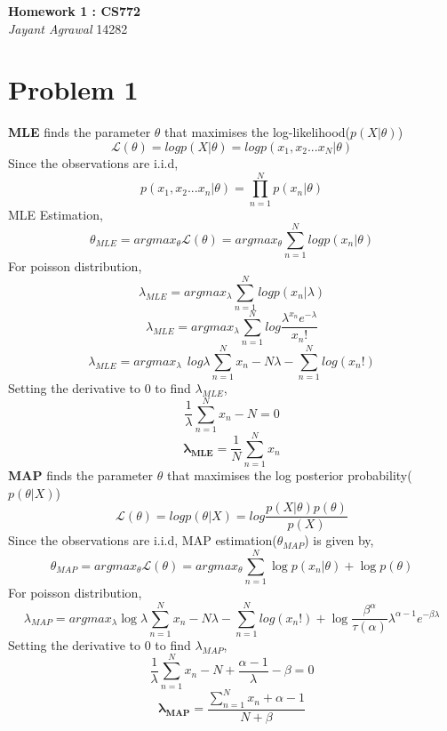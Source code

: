 \documentclass{article}
\begin{document}

\begin{center}
\textbf{\huge Homework 1 : CS772} \\
\vspace{5pt}
\textit{\Large Jayant Agrawal}         14282
\end{center}

\section*{Problem 1}
\textbf{MLE} finds the parameter $\theta$ that maximises the log-likelihood($p(X|\theta)$)
$$\mathcal{L}(\theta) = log p(X|\theta) = log p(x_1, x_2 ...x_N | \theta)$$
Since the observations are i.i.d,
$$ p(x_1, x_2 ...x_n | \theta) = \prod_{n=1}^N p(x_n| \theta)$$
MLE Estimation,
$$\theta_{MLE} = argmax_{\theta} \mathcal{L}(\theta) = argmax_{\theta} \sum_{n=1}^N logp(x_n|\theta)$$
For poisson distribution,
$$\lambda_{MLE} = argmax_{\lambda} \sum_{n=1}^N logp(x_n|\lambda)$$
$$\lambda_{MLE} = argmax_{\lambda} \sum_{n=1}^N log\frac{\lambda^{x_n}e^{-\lambda}}{x_n!}$$
$$\lambda_{MLE} = argmax_{\lambda} \hspace{5pt} log\lambda\sum_{n=1}^Nx_n - N\lambda - \sum_{n=1}^Nlog(x_n!)$$
Setting the derivative to 0 to find $\lambda_{MLE}$,
$$\frac{1}{\lambda}\sum_{n=1}^Nx_n - N = 0$$
$$\mathbf{\lambda_{MLE}} = \frac{1}{N}\sum_{n=1}^Nx_n$$
\textbf{MAP} finds the parameter $\theta$ that maximises the log posterior probability($p(\theta|X)$)
$$\mathcal{L}(\theta) = log p(\theta|X) = log\frac{p(X|\theta)p(\theta)}{p(X)} $$
Since the observations are i.i.d, MAP estimation($\theta_{MAP}$) is given by,
$$\theta_{MAP} = argmax_{\theta} \mathcal{L}(\theta) = argmax_{\theta}\sum_{n=1}^N\log{p(x_n|\theta)}+ \log{p(\theta)} $$
For poisson distribution,
$$\lambda_{MAP} = argmax_{\lambda} \log{\lambda}\sum_{n=1}^Nx_n- N\lambda - \sum_{n=1}^Nlog(x_n!) + \log{\frac{\beta^\alpha}{\tau(\alpha)} \lambda^{\alpha-1} e^{-\beta\lambda}}$$
Setting the derivative to 0 to find $\lambda_{MAP}$,
$$\frac{1}{\lambda}\sum_{n=1}^Nx_n - N + \frac{\alpha-1}{\lambda}- \beta= 0$$
$$\mathbf{\lambda_{MAP}} = \frac{\sum_{n=1}^Nx_n + \alpha-1}{N+\beta}$$
\end{document}
